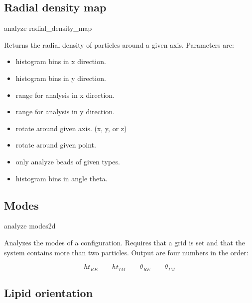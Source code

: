 \subsection{Radial density map}
\label{analyze:radialdensitymap}

\begin{essyntax}
  analyze radial_density_map    
\end{essyntax}

Returns the radial density of particles around a given
axis. Parameters are:


\begin{itemize}
\item {} histogram bins in x direction.
\item {} histogram bins in y direction.
\item {} range for analysis in x direction.
\item {} range for analysis in y direction.
\item {} rotate around given axis. (x, y, or z)
\item {} rotate around given point.
\item {} only analyze beads of given types.
\item {} histogram bins in angle theta.
\end{itemize}

\subsection{Modes}
\label{analyze:modes2d}

\begin{essyntax}
  analyze modes2d
\end{essyntax}

Analyzes the modes of a configuration. Requires that a grid is set and
that the system contains more than two particles. Output are four
numbers in the order:

\begin{displaymath}
ht_{RE}\qquad ht_{IM}\qquad \theta_{RE}\qquad \theta_{IM}
\end{displaymath}

\subsection{Lipid orientation}
\label{analyze:lipids}

